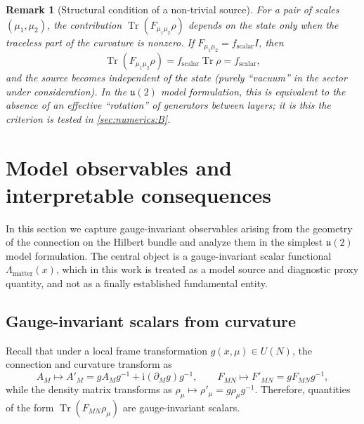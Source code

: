 \documentclass[11pt,a4paper]{article}
\DeclareMathOperator{\Tr}{Tr}
\newcommand{\ii}{\mathrm{i}}
\theoremstyle{definition}
\theoremstyle{plain}
\newtheorem{remark}{Remark}[section]
\theoremstyle{remark}
\begin{document}
\begin{remark}[Structural condition of a non-trivial source]\label{rem:nontrivial_source}
For a pair of scales $(\mu_1,\mu_2)$, the contribution
$\Tr\!\left(F_{\mu_1\mu_2}\rho\right)$
depends on the state only when the traceless part of the curvature is nonzero.
If $F_{\mu_1\mu_2}=f_{\mathrm{scalar}}I$, then
\[
\Tr\!\left(F_{\mu_1\mu_2}\rho\right)=f_{\mathrm{scalar}}\Tr\rho=f_{\mathrm{scalar}},
\]
and the source becomes independent of the state (purely “vacuum” in the sector under consideration).
In the $\mathfrak u(2)$ model formulation, this is equivalent to the absence of an effective “rotation” of generators between layers;
it is this the criterion is tested in \cref{sec:numerics:B}.
\end{remark}

\section{Model observables and interpretable consequences}
\label{sec:theory}

In this section we capture gauge-invariant observables arising from the geometry of the connection on the
Hilbert bundle and analyze them in the simplest $\mathfrak{u}(2)$ model formulation.
The central object is a gauge-invariant scalar functional $\Lambda_{\mathrm{matter}}(x)$,
which in this work is treated as a model source and diagnostic proxy quantity, and not as a finally established fundamental entity.

\subsection{Gauge-invariant scalars from curvature}
\label{sec:theory:gaugeinv}

Recall that under a local frame transformation $g(x,\mu)\in U(N)$, the connection and curvature transform as
\begin{equation}\label{eq:gauge_tr}
A_M \mapsto A'_M = gA_M g^{-1} + \ii(\partial_M g)g^{-1},
\qquad
F_{MN}\mapsto F'_{MN}=gF_{MN}g^{-1},
\end{equation}
while the density matrix transforms as $\rho_\mu\mapsto \rho'_\mu=g\rho_\mu g^{-1}$.
Therefore, quantities of the form $\Tr(F_{MN}\rho_\mu)$ are gauge-invariant scalars.
\end{document}
